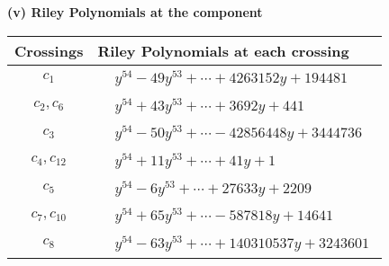 \documentclass[1p]{elsarticle_modified}
\theoremstyle{definition}
\begin{document}
\newpage\renewcommand{\arraystretch}{1}
\flushleft \textbf{(v) Riley Polynomials at the component}\newline \\
\begin{tabular}{m{50pt}|m{274pt}}
Crossings & \hspace{64pt}Riley Polynomials at each crossing \\
\hline $$\begin{aligned}c_{1}\end{aligned}$$&$\begin{aligned}
&y^{54}-49 y^{53}+\cdots+4263152 y+194481
\end{aligned}$\\
\hline $$\begin{aligned}c_{2},c_{6}\end{aligned}$$&$\begin{aligned}
&y^{54}+43 y^{53}+\cdots+3692 y+441
\end{aligned}$\\
\hline $$\begin{aligned}c_{3}\end{aligned}$$&$\begin{aligned}
&y^{54}-50 y^{53}+\cdots-42856448 y+3444736
\end{aligned}$\\
\hline $$\begin{aligned}c_{4},c_{12}\end{aligned}$$&$\begin{aligned}
&y^{54}+11 y^{53}+\cdots+41 y+1
\end{aligned}$\\
\hline $$\begin{aligned}c_{5}\end{aligned}$$&$\begin{aligned}
&y^{54}-6 y^{53}+\cdots+27633 y+2209
\end{aligned}$\\
\hline $$\begin{aligned}c_{7},c_{10}\end{aligned}$$&$\begin{aligned}
&y^{54}+65 y^{53}+\cdots-587818 y+14641
\end{aligned}$\\
\hline $$\begin{aligned}c_{8}\end{aligned}$$&$\begin{aligned}
&y^{54}-63 y^{53}+\cdots+140310537 y+3243601
\end{aligned}$\\

\end{tabular}
\end{document}
